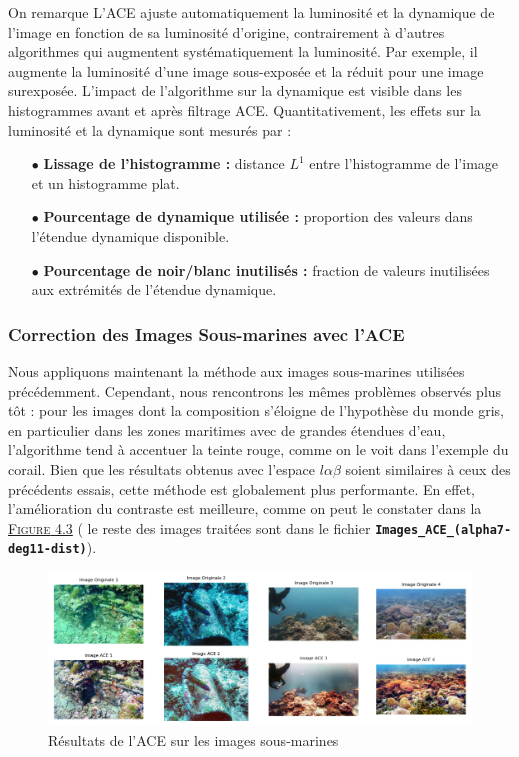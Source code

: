 \documentclass[10pt, a4paper]{extarticle}
\numberwithin{equation}{section}
\numberwithin{figure}{section}
\begin{document}
\par On remarque L'ACE ajuste automatiquement la luminosité et la dynamique de l'image en fonction de sa luminosité d'origine, contrairement à d'autres algorithmes qui augmentent systématiquement la luminosité. Par exemple, il augmente la luminosité d'une image sous-exposée et la réduit pour une image surexposée. L'impact de l'algorithme sur la dynamique est visible dans les histogrammes avant et après filtrage ACE. Quantitativement, les effets sur la luminosité et la dynamique sont mesurés par :
\begin{itemize}
\item[$\bullet$]\textbf{Lissage de l'histogramme :} distance $L^1$ entre l'histogramme de l'image et un histogramme plat.
\item[$\bullet$]\textbf{Pourcentage de dynamique utilisée :} proportion des valeurs dans l'étendue dynamique disponible.
\item[$\bullet$]\textbf{Pourcentage de noir/blanc inutilisés :} fraction de valeurs inutilisées aux extrémités de l'étendue dynamique.
\end{itemize}
\vspace{2mm}

\subsubsection{Correction des Images Sous-marines avec l'ACE}

\par Nous appliquons maintenant la méthode aux images sous-marines utilisées précédemment. Cependant, nous rencontrons les mêmes problèmes observés plus tôt : pour les images dont la composition s'éloigne de l'hypothèse du monde gris, en particulier dans les zones maritimes avec de grandes étendues d'eau, l'algorithme tend à accentuer la teinte rouge, comme on le voit dans l'exemple du corail. Bien que les résultats obtenus avec l'espace $l\alpha\beta$ soient similaires à ceux des précédents essais, cette méthode est globalement plus performante. En effet, l'amélioration du contraste est meilleure, comme on peut le constater dans la \hyperref[figure4.3]{\textsc{Figure} 4.3} ( le reste des images traitées sont dans le fichier \colorbox{gray!15}{\texttt{\textbf{Images\_ACE\_(alpha7-deg11-dist)}}}).  

\begin{figure}[h!]
\begin{center}
\includegraphics[width=18cm]{image002.png}
\end{center}
\label{figure4.3}
\caption{Résultats de l'ACE sur les images sous-marines}
\end{figure} 
\end{document}
